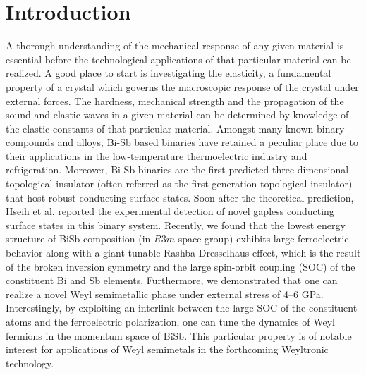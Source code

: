\documentclass[twocolumn,superscriptaddress,nofootinbib,floatfix,aps,showpacs,prb,citeautoscript,reprint]{revtex4-1}
\begin{document}
\date{\today}



\maketitle
\section{Introduction}

A thorough understanding of the mechanical response of any given material is essential before the technological applications of that particular material can be realized. A good place to start is investigating the elasticity, a fundamental property of a crystal which governs the macroscopic response of the crystal under external forces. The hardness, mechanical strength and the propagation of the sound and elastic waves in a given material can be determined by knowledge of the elastic constants of that particular material. Amongst many known binary compounds and alloys, Bi-Sb based binaries have retained a peculiar place due to their applications in the low-temperature thermoelectric industry and refrigeration. \cite{BiSb-thermo1985, lenoir1996bi, YIM1972, LENOIR1996_BiSb, Lv2010} Moreover, Bi-Sb binaries are the first predicted three dimensional topological insulator (often referred as the first generation topological insulator) that host robust conducting surface states. \cite{FuPRB2007, Hseih2008, TeoPRB2008, Zhong2009, KaneRev2010} Soon after the theoretical prediction, Hseih et al. \cite{Hseih2008} reported the experimental detection of novel gapless conducting surface states in this binary system. Recently, we found that the lowest energy structure of BiSb composition (in $R3m$ space group) exhibits large ferroelectric behavior along with a giant tunable Rashba-Dresselhaus effect, which is the result of the broken inversion symmetry and the large spin-orbit coupling (SOC) of the constituent Bi and Sb elements. \cite{sobhit2016PRB, singh2016PCCP} Furthermore, we demonstrated that one can realize a novel Weyl semimetallic phase under external stress of 4--6 GPa.  \cite{sobhit2016PRB} Interestingly, by exploiting an interlink between the large SOC of the constituent atoms and the ferroelectric polarization, one can tune the dynamics of Weyl fermions in the momentum space of BiSb. This particular property is of notable interest for applications of Weyl semimetals in the forthcoming Weyltronic technology. 
\end{document}
